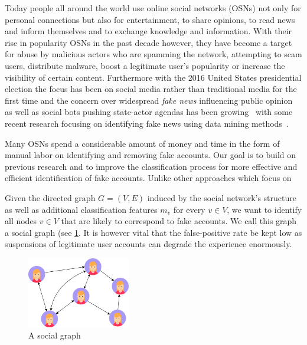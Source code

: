 Today people all around the world use online social networks (OSNs) not only for personal connections but also for entertainment, to share opinions, to read news and inform themselves and to exchange knowledge and information. With their rise in popularity OSNs in the past decade however, they have become a target for abuse by malicious actors who are spamming the network, attempting to scam users, distribute malware, boost a legitimate user's popularity or increase the visibility of certain content. Furthermore with the 2016 United States presidential election the focus has been on social media rather than traditional media for the first time and the concern over widespread \emph{fake news} influencing public opinion as well as social bots pushing state-actor agendas has been growing~\cite{allcott2017social,grinberg2019fake} with some recent research focusing on identifying fake news using data mining methods~\cite{shu2017fake}.

Many OSNs spend a considerable amount of money and time in the form of manual labor on identifying and removing fake accounts. Our goal is to build on previous research and to improve the classification process for more effective and efficient identification of fake accounts. Unlike other approaches which focus on

Given the directed graph $G=(V,E)$ induced by the social network's structure as well as additional classification features $m_v$ for every $v \in V$, we want to identify all nodes $v \in V$ that are likely to correspond to fake accounts. We call this graph a social graph (see \ref{fig:social_graph}. It is however vital that the false-positive rate be kept low as suspensions of legitimate user accounts can degrade the experience enormously.


\begin{figure}
    \centering
    \includegraphics[width=0.4\textwidth]{FIG/social_graph}
    \caption{A social graph}
    \label{fig:social_graph}
\end{figure}

